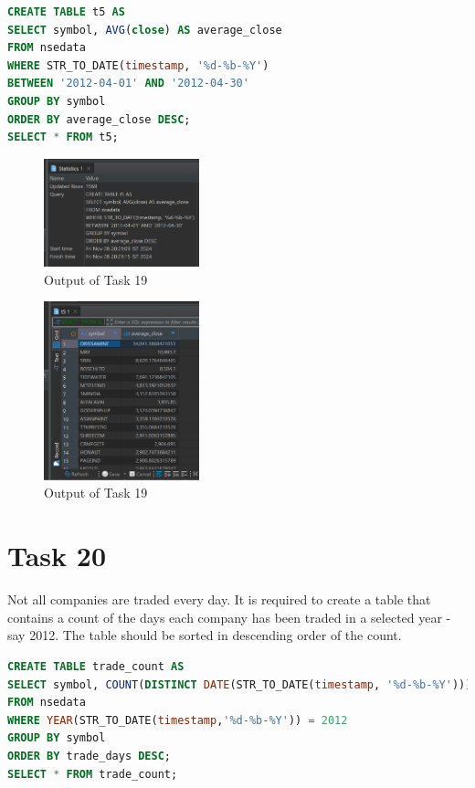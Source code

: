 \documentclass{article}
\begin{document}
\begin{lstlisting}[language=SQL, caption=Creating Table t5]
CREATE TABLE t5 AS
SELECT symbol, AVG(close) AS average_close
FROM nsedata
WHERE STR_TO_DATE(timestamp, '%d-%b-%Y')
BETWEEN '2012-04-01' AND '2012-04-30'
GROUP BY symbol
ORDER BY average_close DESC;
SELECT * FROM t5;
\end{lstlisting}

\begin{figure}[H]
	\centering
	\includegraphics[width=0.4\textwidth]{Images/Task19-1.png}
	\caption{Output of Task 19}
\end{figure}

\begin{figure}[H]
	\centering
	\includegraphics[width=0.4\textwidth]{Images/Task19-2.png}
	\caption{Output of Task 19}
\end{figure}

\section*{Task 20}

\begin{task*}[20]
Not all companies are traded every day. It is required to create a table that contains a count of the days each company has been traded in a selected year - say 2012. The table should be sorted in descending order of the count.
\end{task*}

\begin{lstlisting}[language=SQL, caption=Creating Table trade\_count]
CREATE TABLE trade_count AS
SELECT symbol, COUNT(DISTINCT DATE(STR_TO_DATE(timestamp, '%d-%b-%Y'))) AS trade_days
FROM nsedata
WHERE YEAR(STR_TO_DATE(timestamp,'%d-%b-%Y')) = 2012
GROUP BY symbol
ORDER BY trade_days DESC;
SELECT * FROM trade_count;
\end{lstlisting}
\end{document}
